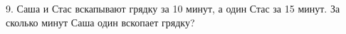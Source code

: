9. Саша и Стас вскапывают грядку за 10 минут, а один Стас за 15 минут. За сколько минут Саша один вскопает грядку?\\
